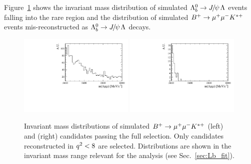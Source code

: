 Figure~\ref{fig:peakingBkgs} shows the invariant mass distribution of simulated $\Lb\ra\jpsi\Lz$
events falling into the rare \qsq region and the distribution of simulated $B^{+} \rightarrow{\ensuremath{\mu^+\mu^-}} K^{*+}$
events mis-reconstructed as $\Lb\ra\jpsi\Lz$ decays.
%
\begin{figure}
\centering
\includegraphics[width=0.49\textwidth]{Lmumu/figs/Bu2Kstplus_mass.pdf}
\includegraphics[width=0.49\textwidth]{Lmumu/figs/JpsiL_leakage_mass.pdf}
\caption{ Invariant mass distributions of simulated $B^{+} \rightarrow{\ensuremath{\mu^+\mu^-}} K^{*+}$ (left)
and \Lb\to\jpsi\Lz (right) candidates passing the full selection. Only \Lb\to\jpsi\Lz
candidates reconstructed in ${q^2} < 8$ \gevgevcccc are selected.
Distributions are shown in the invariant mass range relevant for the analysis 
(see Sec.~\ref{sec:Lb_fit}). }
\label{fig:peakingBkgs}
\end{figure}

